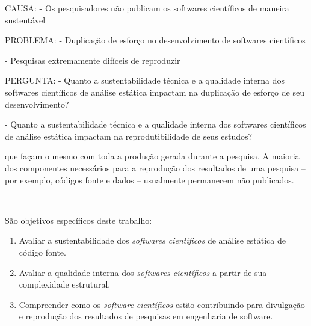 CAUSA:    - Os pesquisadores não publicam os softwares científicos de maneira
            sustentável

PROBLEMA: - Duplicação de esforço no desenvolvimento de softwares científicos

          - Pesquisas extremamente difíceis de reproduzir

PERGUNTA: - Quanto a sustentabilidade técnica e a qualidade interna dos
            softwares científicos de análise estática impactam na duplicação de
            esforço de seu desenvolvimento?

          - Quanto a sustentabilidade técnica e a qualidade interna dos
            softwares científicos de análise estática impactam na
            reprodutibilidade de seus estudos?

que façam o mesmo com toda a produção gerada durante a pesquisa. A maioria dos
componentes necessários para a reprodução dos resultados de uma pesquisa – por
exemplo, códigos fonte e dados – usualmente permanecem não publicados.

---

São objetivos específicos deste trabalho:

\begin{enumerate}
  \item Avaliar a sustentabilidade dos {\it softwares científicos} de análise estática de código fonte.
  \item Avaliar a qualidade interna dos {\it softwares científicos} a partir de sua complexidade estrutural.
  \item Compreender como os {\it software científicos} estão contribuindo para divulgação e reprodução dos resultados de pesquisas em engenharia de software.
\end{enumerate}


